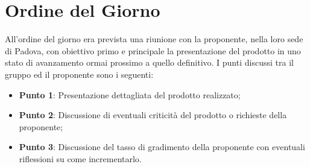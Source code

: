 \section{Ordine del Giorno}
All'ordine del giorno era prevista una riunione  con la proponente, nella loro sede di Padova, con obiettivo primo e principale la presentazione del prodotto in uno stato di avanzamento ormai prossimo a quello definitivo. 
I punti discussi tra il gruppo ed il proponente sono i seguenti: 
\begin{itemize}
	\item \textbf{Punto 1}: Presentazione dettagliata del prodotto realizzato; 
	\item \textbf{Punto 2}: Discussione di eventuali criticità del prodotto o richieste della proponente; 
	\item \textbf{Punto 3}: Discussione del tasso di gradimento della proponente con eventuali riflessioni su come incrementarlo.
\end{itemize}